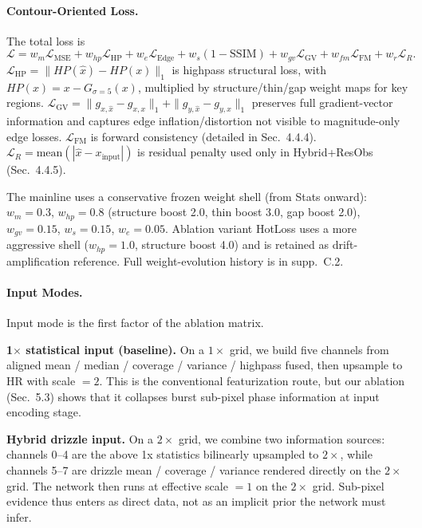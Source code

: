\paragraph{Contour-Oriented Loss.}
The total loss is
\[
\mathcal{L}=w_m\mathcal{L}_{\mathrm{MSE}}+w_{hp}\mathcal{L}_{\mathrm{HP}}+w_e\mathcal{L}_{\mathrm{Edge}}+w_s(1-\mathrm{SSIM})+w_{gv}\mathcal{L}_{\mathrm{GV}}+w_{fm}\mathcal{L}_{\mathrm{FM}}+w_r\mathcal{L}_R.
\]
$\mathcal{L}_{\mathrm{HP}}=\|HP(\hat{x})-HP(x)\|_1$ is highpass structural loss, with $HP(x)=x-G_{\sigma=5}(x)$, multiplied by structure/thin/gap weight maps for key regions. $\mathcal{L}_{\mathrm{GV}}=\|g_{x,\hat{x}}-g_{x,x}\|_1+\|g_{y,\hat{x}}-g_{y,x}\|_1$ preserves full gradient-vector information and captures edge inflation/distortion not visible to magnitude-only edge losses. $\mathcal{L}_{\mathrm{FM}}$ is forward consistency (detailed in Sec.~4.4.4). $\mathcal{L}_R=\mathrm{mean}(|\hat{x}-x_{\mathrm{input}}|)$ is residual penalty used only in Hybrid+ResObs (Sec.~4.4.5).

The mainline uses a conservative frozen weight shell (from Stats onward): $w_m=0.3$, $w_{hp}=0.8$ (structure boost 2.0, thin boost 3.0, gap boost 2.0), $w_{gv}=0.15$, $w_s=0.15$, $w_e=0.05$. Ablation variant HotLoss uses a more aggressive shell ($w_{hp}=1.0$, structure boost 4.0) and is retained as drift-amplification reference. Full weight-evolution history is in supp.~C.2.

\paragraph{Input Modes.}
Input mode is the first factor of the ablation matrix.

\textbf{1$\times$ statistical input (baseline).}
On a $1\times$ grid, we build five channels from aligned mean / median / coverage / variance / highpass fused, then upsample to HR with scale $=2$. This is the conventional featurization route, but our ablation (Sec.~5.3) shows that it collapses burst sub-pixel phase information at input encoding stage.

\textbf{Hybrid drizzle input.}
On a $2\times$ grid, we combine two information sources: channels 0--4 are the above 1x statistics bilinearly upsampled to $2\times$, while channels 5--7 are drizzle mean / coverage / variance rendered directly on the $2\times$ grid. The network then runs at effective scale $=1$ on the $2\times$ grid. Sub-pixel evidence thus enters as direct data, not as an implicit prior the network must infer.

